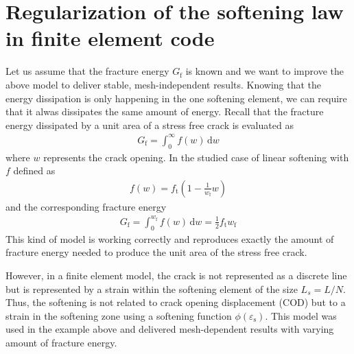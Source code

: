 \documentclass[main.tex]{subfiles}
\begin{document}


\section{Regularization of the softening law in finite element code}

Let us assume that the fracture energy $G_\mathrm{f}$ is known and  we want to improve the above model to deliver stable, mesh-independent results. Knowing that the energy dissipation is only happening in the one softening element, we can require that it alwas dissipates the same amount of energy. Recall that the fracture energy dissipated by a unit area of a stress free crack is evaluated as 
\begin{align}
G_\mathrm{f} = \int_0^{\infty} f(w) \, \mathrm{d}w
\end{align}
where $w$ represents the crack opening.
In the studied case of linear softening with $f$ defined as
\begin{align}
f(w) = f_\mathrm{t}\left( 1 - \frac{1}{w_\mathrm{f}} w \right)
\end{align}
and the corresponding fracture energy
\begin{align}
G_\mathrm{f} = \int_0^{w_\mathrm{f}} f(w) \, \mathrm{d}w = \frac{1}{2} f_\mathrm{t} w_\mathrm{f}
\end{align}
This kind of model is working correctly and reproduces exactly the amount of fracture energy needed to produce the unit area of the stress free crack. 

However, in a finite element model, the crack is not represented as a discrete line but is represented by a strain within the softening element of the size $L_s = L / N$. Thus, the softening is not related to crack opening displacement (COD) but to a strain in the softening zone using a softening function $\phi(\varepsilon_\mathrm{s})$. This model was used in the example above and delivered mesh-dependent results with varying amount of fracture energy.
\end{document}
